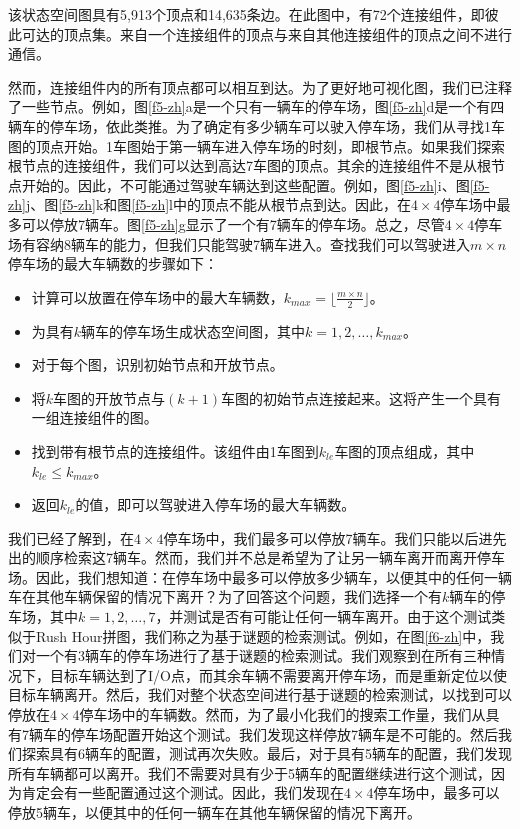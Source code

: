 
该状态空间图具有5,913个顶点和14,635条边。在此图中，有72个连接组件，即彼此可达的顶点集。来自一个连接组件的顶点与来自其他连接组件的顶点之间不进行通信。

然而，连接组件内的所有顶点都可以相互到达。为了更好地可视化图，我们已注释了一些节点。例如，图\ref{f5-zh}a是一个只有一辆车的停车场，图\ref{f5-zh}d是一个有四辆车的停车场，依此类推。为了确定有多少辆车可以驶入停车场，我们从寻找1车图的顶点开始。1车图始于第一辆车进入停车场的时刻，即根节点。如果我们探索根节点的连接组件，我们可以达到高达7车图的顶点。其余的连接组件不是从根节点开始的。因此，不可能通过驾驶车辆达到这些配置。例如，图\ref{f5-zh}i、图\ref{f5-zh}j、图\ref{f5-zh}k和图\ref{f5-zh}l中的顶点不能从根节点到达。因此，在$4 \times 4$停车场中最多可以停放7辆车。图\ref{f5-zh}g显示了一个有7辆车的停车场。总之，尽管$4 \times 4$停车场有容纳8辆车的能力，但我们只能驾驶7辆车进入。查找我们可以驾驶进入$m \times n$停车场的最大车辆数的步骤如下：

\begin{itemize}
    \item 计算可以放置在停车场中的最大车辆数，$k_{max} = \lfloor\frac{m\times n}{2}\rfloor$。
    \item 为具有$k$辆车的停车场生成状态空间图，其中$k = 1, 2, \dots, k_{max}$。
    \item 对于每个图，识别初始节点和开放节点。
    \item 将$k$车图的开放节点与$(k +1)$车图的初始节点连接起来。这将产生一个具有一组连接组件的图。
    \item 找到带有根节点的连接组件。该组件由1车图到$k_{le}$车图的顶点组成，其中$k_{le}\le k_{max}$。
    \item 返回$k_{le}$的值，即可以驾驶进入停车场的最大车辆数。
\end{itemize}

我们已经了解到，在$4 \times 4$停车场中，我们最多可以停放7辆车。我们只能以后进先出的顺序检索这7辆车。然而，我们并不总是希望为了让另一辆车离开而离开停车场。因此，我们想知道：在停车场中最多可以停放多少辆车，以便其中的任何一辆车在其他车辆保留的情况下离开？为了回答这个问题，我们选择一个有$k$辆车的停车场，其中$k = 1,2,\dots,7$，并测试是否有可能让任何一辆车离开。由于这个测试类似于Rush Hour拼图，我们称之为基于谜题的检索测试。例如，在图\ref{f6-zh}中，我们对一个有3辆车的停车场进行了基于谜题的检索测试。我们观察到在所有三种情况下，目标车辆达到了I/O点，而其余车辆不需要离开停车场，而是重新定位以使目标车辆离开。然后，我们对整个状态空间进行基于谜题的检索测试，以找到可以停放在$4 \times 4$停车场中的车辆数。然而，为了最小化我们的搜索工作量，我们从具有7辆车的停车场配置开始这个测试。我们发现这样停放7辆车是不可能的。然后我们探索具有6辆车的配置，测试再次失败。最后，对于具有5辆车的配置，我们发现所有车辆都可以离开。我们不需要对具有少于5辆车的配置继续进行这个测试，因为肯定会有一些配置通过这个测试。因此，我们发现在$4 \times 4$停车场中，最多可以停放5辆车，以便其中的任何一辆车在其他车辆保留的情况下离开。


